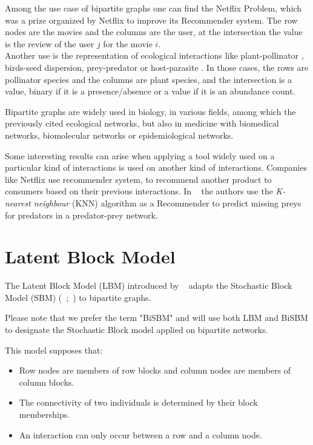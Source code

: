 \documentclass[12pt,a4paper]{report}
\begin{document}
Among the use case of bipartite graphs one can find the Netflix Problem, which
was a prize organized by Netflix to improve its Recommender system. The row
nodes are the movies and the columns are the user, at the intersection the value
is the review of the user $j$ for the movie $i$.\\

Another use is the representation of ecological interactions like
plant-pollinator \parencite{ramos-jilibertoTopologicalChangeAndean2010}, birds-seed
dispersion, prey-predator or
host-parasite \parencite{kaszewska-gilasGlobalStudiesHostParasite2021}.
In those cases, the rows are pollinator species and the columns are plant
species, and the intersection is a value, binary if it is a presence/absence or
a value if it is an abundance count.

Bipartite graphs are widely used in biology, in various fields, among which the
previously cited ecological networks, but also in medicine with biomedical
networks, biomolecular networks or epidemiological
networks. \parencite{pavlopoulosBipartiteGraphsSystems2018}


Some interesting results can arise when applying a tool widely used on a particular
kind of interactions is used on another kind of interactions. Companies like
Netflix use recommender system, to recommend another product to consumers based
on their previous interactions.
In ~\cite{desjardins-proulxEcologicalInteractionsNetflix2017} the authors use the
\emph{K-nearest neighbour} (KNN) algorithm as a Recommender to predict missing
preys for predators in a predator-prey network.

\section{Latent Block Model}
\label{sec:latent-block-model}
The Latent Block Model (LBM) introduced by ~\cite{govaertLatentBlockModel2010}
adapts the Stochastic Block Model (SBM)
(~\cite{hollandStochasticBlockmodelsFirst1983};~\cite{snijdersEstimationPredictionStochastic1997})
to bipartite graphs.

\begin{small}
    Please note that we prefer the term "BiSBM" and will use both LBM and BiSBM to
    designate the Stochastic Block model applied on bipartite networks.
\end{small}

This model supposes that:
\begin{itemize}
    \item Row nodes are members of row blocks and column nodes are members of
          column blocks.
    \item The connectivity of two individuals is determined by their block
          memberships.
    \item An interaction can only occur between a row and a column node.
\end{itemize}
\end{document}
